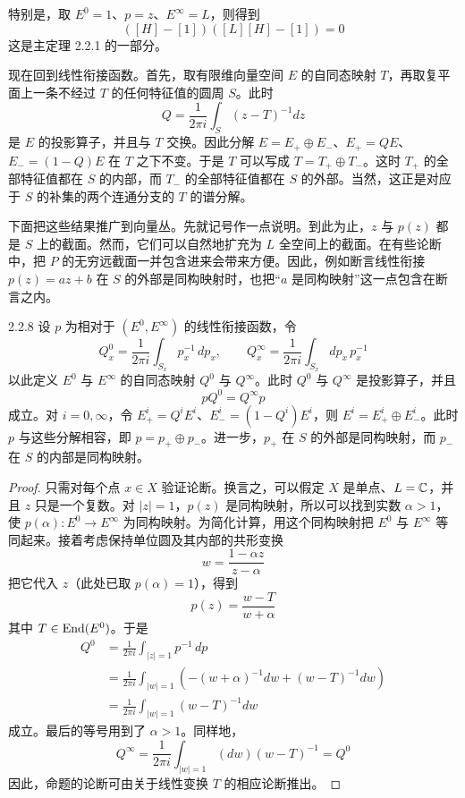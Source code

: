 特别是，取 $E^0=1$、$p=z$、$E^\infty=L$，则得到
\[
([H]-[1])([L][H]-[1])=0
\]
这是主定理 2.2.1 的一部分。

现在回到线性衔接函数。首先，取有限维向量空间 $E$ 的自同态映射 $T$，再取复平面上一条不经过 $T$ 的任何特征值的圆周 $S$。此时
\[
Q=\frac{1}{2\pi i}\int_S (z-T)^{-1}dz
\]
是 $E$ 的投影算子，并且与 $T$ 交换。因此分解 $E=E_+\oplus E_-$、$E_+=QE$、$E_-=(1-Q)E$ 在 $T$ 之下不变。于是 $T$ 可以写成 $T=T_+\oplus T_-$。这时 $T_+$ 的全部特征值都在 $S$ 的内部，而 $T_-$ 的全部特征值都在 $S$ 的外部。当然，这正是对应于 $S$ 的补集的两个连通分支的 $T$ 的谱分解。

下面把这些结果推广到向量丛。先就记号作一点说明。到此为止，$z$ 与 $p(z)$ 都是 $S$ 上的截面。然而，它们可以自然地扩充为 $L$ 全空间上的截面。在有些论断中，把 $P$ 的无穷远截面一并包含进来会带来方便。因此，例如断言线性衔接 $p(z)=az+b$ 在 $S$ 的外部是同构映射时，也把“$a$ 是同构映射”这一点包含在断言之内。


\begin{proposition*}{2.2.8}
  设 $p$ 为相对于 $(E^0,E^\infty)$ 的线性衔接函数，令
  \[
  Q^0_x=\frac{1}{2\pi i}\int_{S_x}p_x^{-1}\,dp_x,\qquad
  Q^\infty_x=\frac{1}{2\pi i}\int_{S_x}dp_x\,p_x^{-1}
  \]
  以此定义 $E^0$ 与 $E^\infty$ 的自同态映射 $Q^0$ 与 $Q^\infty$。此时 $Q^0$ 与 $Q^\infty$ 是投影算子，并且
  \[
  pQ^0=Q^\infty p
  \]
  成立。对 $i=0,\infty$，令 $E^i_+=Q^iE^i$、$E^i_-=(1-Q^i)E^i$，则
  $E^i=E^i_+\oplus E^i_-$。此时 $p$ 与这些分解相容，即 $p=p_+\oplus p_-$。进一步，$p_+$ 在 $S$ 的外部是同构映射，而 $p_-$ 在 $S$ 的内部是同构映射。
\end{proposition*}

\begin{proof}
  只需对每个点 $x\in X$ 验证论断。换言之，可以假定 $X$ 是单点、$L=\mathbb{C}$，并且 $z$ 只是一个复数。对 $|z|=1$，$p(z)$ 是同构映射，所以可以找到实数 $\alpha>1$，使 $p(\alpha)\colon E^0\to E^\infty$ 为同构映射。为简化计算，用这个同构映射把 $E^0$ 与 $E^\infty$ 等同起来。接着考虑保持单位圆及其内部的共形变换
  \[
  w=\frac{1-\alpha z}{z-\alpha}
  \]
  把它代入 $z$（此处已取 $p(\alpha)=1$），得到
  \[
  p(z)=\frac{w-T}{w+\alpha}
  \]
  其中 $T\in\operatorname{End}(E^0)$。于是
  \begin{align*}
  Q^0&=\frac{1}{2\pi i}\int_{|z|=1}p^{-1}\,dp\\
  &=\frac{1}{2\pi i}\int_{|w|=1}\left(-(w+\alpha)^{-1}dw+(w-T)^{-1}dw\right)\\
  &=\frac{1}{2\pi i}\int_{|w|=1}(w-T)^{-1}dw
  \end{align*}
  成立。最后的等号用到了 $\alpha>1$。同样地，
  \[
  Q^\infty=\frac{1}{2\pi i}\int_{|w|=1}(dw)(w-T)^{-1}=Q^0
  \]
  因此，命题的论断可由关于线性变换 $T$ 的相应论断推出。
\end{proof}

